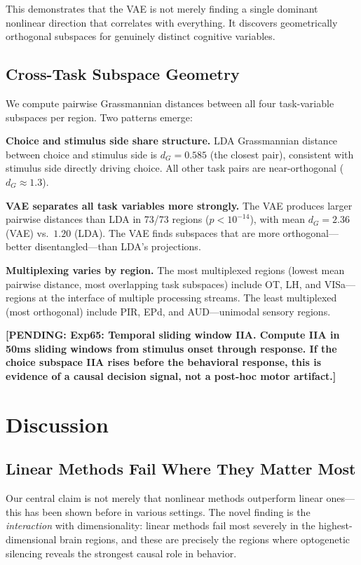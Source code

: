 \documentclass{article}
\newcommand{\pending}[1]{\textcolor{red!70!black}{\textbf{[PENDING: #1]}}}
\begin{document}
This demonstrates that the VAE is not merely finding a single dominant nonlinear direction that correlates with everything. It discovers geometrically orthogonal subspaces for genuinely distinct cognitive variables.

\subsection{Cross-Task Subspace Geometry}

We compute pairwise Grassmannian distances between all four task-variable subspaces per region. Two patterns emerge:

\textbf{Choice and stimulus side share structure.} LDA Grassmannian distance between choice and stimulus side is $d_G = 0.585$ (the closest pair), consistent with stimulus side directly driving choice. All other task pairs are near-orthogonal ($d_G \approx 1.3$).

\textbf{VAE separates all task variables more strongly.} The VAE produces larger pairwise distances than LDA in 73/73 regions ($p < 10^{-14}$), with mean $d_G = 2.36$ (VAE) vs.\ $1.20$ (LDA). The VAE finds subspaces that are more orthogonal---better disentangled---than LDA's projections.

\textbf{Multiplexing varies by region.} The most multiplexed regions (lowest mean pairwise distance, most overlapping task subspaces) include OT, LH, and VISa---regions at the interface of multiple processing streams. The least multiplexed (most orthogonal) include PIR, EPd, and AUD---unimodal sensory regions.

\pending{Exp65: Temporal sliding window IIA. Compute IIA in 50ms sliding windows from stimulus onset through response. If the choice subspace IIA rises before the behavioral response, this is evidence of a causal decision signal, not a post-hoc motor artifact.}

\section{Discussion}

\subsection{Linear Methods Fail Where They Matter Most}

Our central claim is not merely that nonlinear methods outperform linear ones---this has been shown before in various settings. The novel finding is the \emph{interaction} with dimensionality: linear methods fail most severely in the highest-dimensional brain regions, and these are precisely the regions where optogenetic silencing reveals the strongest causal role in behavior.
\end{document}
